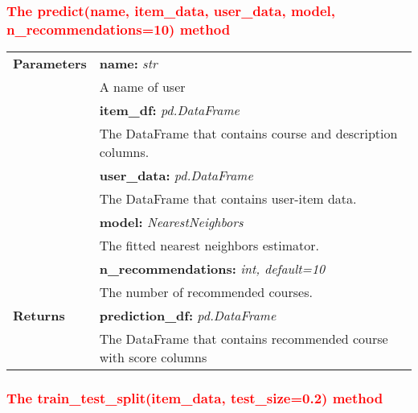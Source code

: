 \subsubsection{\textcolor{red}{The predict(name, item\_data, user\_data, model, n\_recommendations=10) method}}

\vspace{-7mm}
\begin{table}[H]
\small
\begin{tabularx}{\textwidth}{|p{2cm}|X|}
\hline
\textbf{Parameters} & \textbf{name:} \textit{str} \\ & \hspace{5mm} A name of user \\
& \textbf{item\_df:} \textit{pd.DataFrame} \\ & \hspace{5mm} The DataFrame that contains course and description columns. \\
& \textbf{user\_data:} \textit{pd.DataFrame} \\ & \hspace{5mm} The DataFrame that contains user-item data. \\
& \textbf{model:} \textit{NearestNeighbors} \\ & \hspace{5mm} The fitted nearest neighbors estimator. \\
& \textbf{n\_recommendations:} \textit{int, default=10} \\ & \hspace{5mm} The number of recommended courses. \\
\textbf{Returns} & \textbf{prediction\_df:} \textit{pd.DataFrame} \\ & \hspace{5mm} The DataFrame that contains recommended course with score columns \\
\hline
\end{tabularx}
\end{table}

\subsubsection{\textcolor{red}{The train\_test\_split(item\_data, test\_size=0.2) method}}

